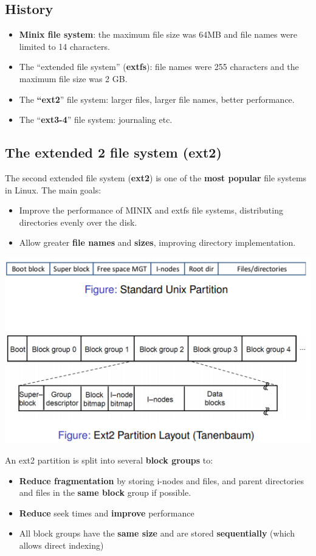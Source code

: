 \documentclass{article}
\begin{document}
\subsection{History}
\begin{itemize}
	\item \textbf{Minix file system}: the maximum file size was 64MB and file names were limited to 14 characters.
	\item The “extended file system” (\textbf{extfs}): file names were 255 characters and the maximum file size was 2 GB.
	\item The \textbf{“ext2}” file system: larger files, larger file names, better performance.
	\item The “\textbf{ext3-4}” file system: journaling etc.
\end{itemize}

\subsection{The extended 2 file system (ext2)}
\begin{flushleft}
The second extended file system (\textbf{ext2}) is one of the \textbf{most popular} file systems in Linux. The main goals:
\begin{itemize}
	\item Improve the performance of MINIX and extfs file systems, distributing directories evenly over the disk.
	\item Allow greater \textbf{file names} and \textbf{sizes}, improving directory implementation.
\end{itemize}
\begin{center}
	\includegraphics[scale=0.4]{ext2_vs_reg.png}
\end{center}
An ext2 partition is split into several \textbf{block groups} to:
\begin{itemize}
	\item \textbf{Reduce fragmentation} by storing i-nodes and files, and parent directories and files in the \textbf{same block} group if possible.
	\item \textbf{Reduce} seek times and \textbf{improve} performance
	\item All block groups have the \textbf{same size} and are stored \textbf{sequentially} (which allows direct indexing)
\end{itemize}
\end{flushleft}
\end{document}
